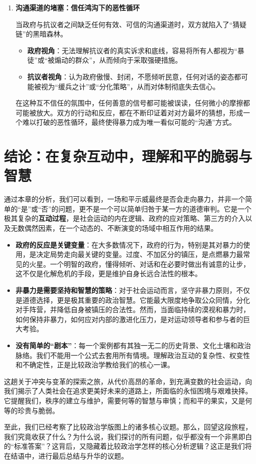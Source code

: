\begin{enumerate}
    \item \textbf{沟通渠道的堵塞：信任鸿沟下的恶性循环}

    当政府与抗议者之间缺乏任何有效、可信的沟通渠道时，双方就陷入了“猜疑链”的黑暗森林。
    \begin{itemize}
        \item \textbf{政府视角}：无法理解抗议者的真实诉求和底线，容易将所有人都视为“暴徒”或“被煽动的群众”，从而倾向于采取强硬措施。
        \item \textbf{抗议者视角}：认为政府傲慢、封闭，不愿倾听民意，任何对话的姿态都可能被视为“缓兵之计”或“分化策略”，从而对体制彻底失去信心。
    \end{itemize}

    在这种互不信任的氛围中，任何善意的信号都可能被误读，任何微小的摩擦都可能被放大。双方的行动和反应，都在不断印证着对对方最坏的猜想，形成一个难以打破的恶性循环，最终使得暴力成为唯一看似可能的“沟通”方式。
\end{enumerate}

\section{ 结论：在复杂互动中，理解和平的脆弱与智慧}

通过本章的分析，我们可以看到，一场和平示威最终是否会走向暴力，并非一个简单的“是”或“否”的问题，更不是一个可以简单归咎于某一方的道德审判。它是一个极其复杂的\textbf{互动过程}，是社会运动的内在逻辑、政府的应对策略、第三方的介入以及无数偶然因素，在一个动态的、不断演变的场域中相互作用的结果。

\begin{itemize}
    \item \textbf{政府的反应是关键变量}：在大多数情况下，政府的行为，特别是其对暴力的使用，是决定局势走向最关键的变量。过度、不加区分的镇压，是点燃暴力最常见的火星。一个明智的政府，懂得倾听、对话和在必要时做出有诚意的让步，这不仅是化解危机的手段，更是维护自身长远合法性的根本。
    \item \textbf{非暴力是需要坚持和智慧的策略}：对于社会运动而言，坚守非暴力原则，不仅是道德选择，更是极其重要的政治智慧。它能最大限度地争取公众同情，分化对手阵营，并降低自身被镇压的合法性。然而，当面临持续的漠视和暴力时，如何保持非暴力，如何应对内部的激进化压力，是对运动领导者和参与者的巨大考验。
    \item \textbf{没有简单的“剧本”}：每一个案例都有其独一无二的历史背景、文化土壤和政治脉络。我们不能用一个公式去套用所有情境。理解政治互动的复杂性、权变性和不确定性，正是比较政治学教给我们的核心一课。
\end{itemize}

这趟关于冲突与变革的探索之旅，从代价高昂的革命，到充满变数的社会运动，向我们揭示了人类社会在追求更美好未来的道路上，所面临的永恒困境与艰难抉择。它提醒我们，秩序的建立与维护，需要何等的智慧与审慎；而和平的果实，又是何等的珍贵与脆弱。

至此，我们已经考察了比较政治学版图上的诸多核心议题。那么，回望这段旅程，我们究竟收获了什么？为什么说，我们探讨的所有问题，似乎都没有一个非黑即白的“标准答案”？这背后，又隐藏着比较政治学怎样的核心分析逻辑？这正是我们将在结语中，进行最后总结与升华的议题。